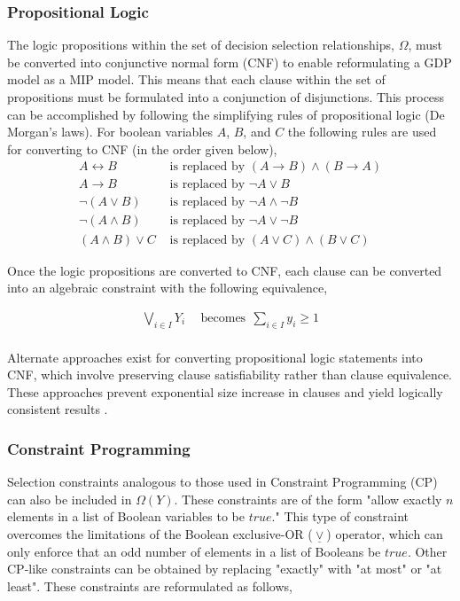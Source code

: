 \documentclass{juliacon}
\begin{document}
\subsubsection{Propositional Logic}
The logic propositions within the set of decision selection relationships, $\Omega$, must be converted into conjunctive normal form (CNF) to enable reformulating a GDP model as a MIP model. This means that each clause within the set of propositions must be formulated into a conjunction of disjunctions. This process can be accomplished by following the simplifying rules of propositional logic (De Morgan's laws). For boolean variables $A$, $B$, and $C$ the following rules are used for converting to CNF (in the order given below),
\begin{align*}
    A \leftrightarrow B & \text{ is replaced by } (A \rightarrow B) \land (B \rightarrow A) \\
    A \rightarrow B & \text{ is replaced by } \lnot A \lor B \\
    \lnot(A \lor B) & \text{ is replaced by } \lnot A \land \lnot B \\
    \lnot(A \land B) & \text{ is replaced by } \lnot A \lor \lnot B \\
    (A \land B) \lor C & \text{ is replaced by } (A \lor C) \land (B \lor C)
\end{align*}

Once the logic propositions are converted to CNF, each clause can be converted into an algebraic constraint with the following equivalence,

\begin{align*}
    \bigvee_{i \in I} Y_i & \ \ \text{becomes} \ \ \sum_{i\in I} y_i \geq 1 \\
\end{align*}

Alternate approaches exist for converting propositional logic statements into CNF, which involve preserving clause satisfiability rather than clause equivalence. These approaches prevent exponential size increase in clauses and yield logically consistent results \cite{jackson_sheridan_2005}.

\subsubsection{Constraint Programming}
Selection constraints analogous to those used in Constraint Programming (CP) can also be included in $\Omega(Y)$. These constraints are of the form "allow exactly $n$ elements in a list of Boolean variables to be $true$." This type of constraint overcomes the limitations of the Boolean exclusive-OR ($\underline{\vee}$) operator, which can only enforce that an odd number of elements in a list of Booleans be $true$. Other CP-like constraints can be obtained by replacing "exactly" with "at most" or "at least". These constraints are reformulated as follows,
\end{document}

